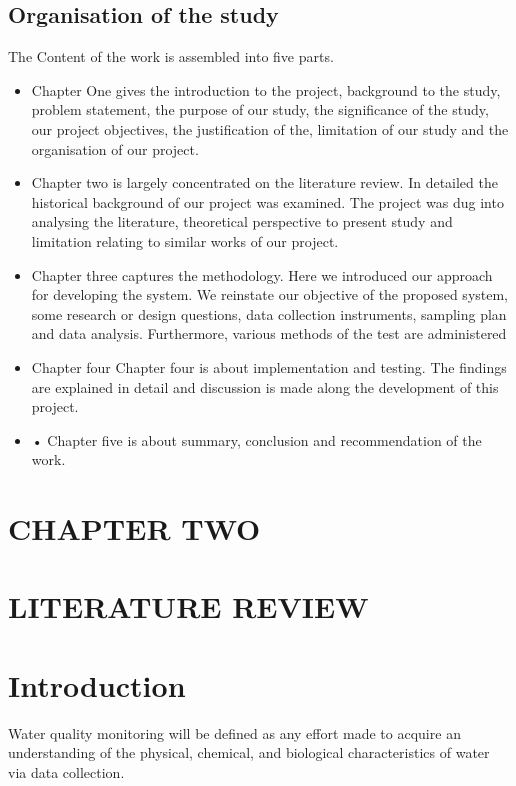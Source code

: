 \documentclass[12pt]{article}
\begin{document}
\subsection*{Organisation of the study}
The Content of the work is assembled into five parts.\\
			\begin{itemize}
				\item Chapter One gives the introduction to the project, background to the study, problem statement, the purpose of our study, the significance of the study, our project objectives, the justification of the, limitation of our study and the organisation of our project.
				\item Chapter two is largely concentrated on the literature review.  In detailed the historical background of our project was examined. The project was dug into analysing the literature, theoretical perspective to present study and limitation relating to similar works of our project.
				\item  Chapter three captures the methodology. Here we introduced our approach for developing the system. We reinstate our objective of the proposed system, some research or design questions, data collection instruments, sampling plan and data analysis. Furthermore, various methods of the test are administered 
				\item Chapter four Chapter four is about implementation and testing. The findings are explained in detail and discussion is made along the development of this project.
				\item •	Chapter five is about summary, conclusion and recommendation of the work.
			\end{itemize}
	
	\begin{center}
	
	
	
	
	\clearpage	%
		\section*{CHAPTER TWO}
		\section*{LITERATURE REVIEW}
	\end{center}

	\section*{Introduction}
		Water quality monitoring will be defined as any effort made to acquire an understanding of the physical, chemical, and biological characteristics of water via data collection.  \\
		
\end{document}

